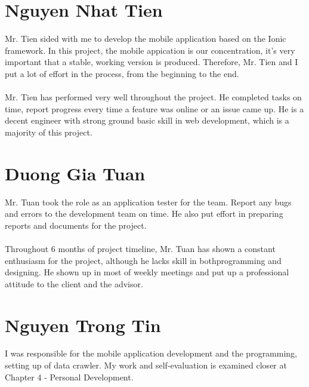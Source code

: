 \section{Nguyen Nhat Tien}
Mr. Tien sided with me to develop the mobile application based on the Ionic framework. In this project, the mobile appication is our concentration, it's very important that a stable, working version is produced. Therefore, Mr. Tien and I put a lot of effort in the process, from the beginning to the end.
\\
\\
Mr. Tien has performed very well throughout the project. He completed tasks on time, report progress every time a feature was online or an issue came up. He is a decent engineer with strong ground basic skill in web development, which is a majority of this project.
\section{Duong Gia Tuan}
Mr. Tuan took the role as an application tester for the team. Report any bugs and errors to the development team on time. He also put effort in preparing reports and documents for the project.
\\
\\
Throughout 6 months of project timeline, Mr. Tuan has shown a constant enthusiasm for the project, although he lacks skill in bothprogramming and designing. He shown up in most of weekly meetings and put up a professional attitude to the client and the advisor.
\section{Nguyen Trong Tin}
I was responsible for the mobile application development and the programming, setting up of data crawler. My work and self-evaluation is examined closer at Chapter 4 - Personal Development.